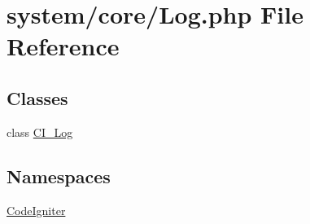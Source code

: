 \hypertarget{_log_8php}{}\section{system/core/\+Log.php File Reference}
\label{_log_8php}
\subsection*{Classes}
\begin{DoxyCompactItemize}
\item 
class \mbox{\hyperlink{class_c_i___log}{C\+I\+\_\+\+Log}}
\end{DoxyCompactItemize}
\subsection*{Namespaces}
\begin{DoxyCompactItemize}
\item 
 \mbox{\hyperlink{namespace_code_igniter}{Code\+Igniter}}
\end{DoxyCompactItemize}
